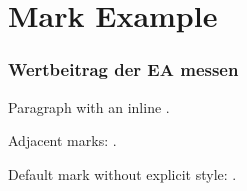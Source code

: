 \section{Mark Example}\label{mark-example}

\subsubsection{\texorpdfstring{
Wertbeitrag der EA
messen}{ Wertbeitrag der EA messen}}\label{kr-2-1-2-wertbeitrag-der-ea-messen}

Paragraph with an inline .

Adjacent marks: .

Default mark without explicit style: .
